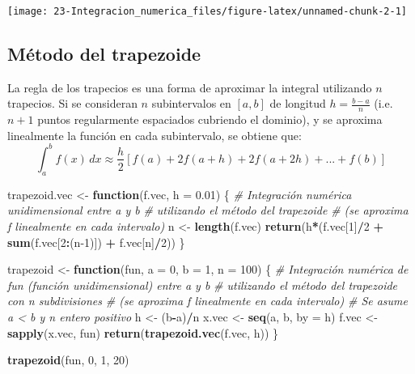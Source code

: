 \documentclass[
]{book}
\newenvironment{Shaded}{\begin{snugshade}}{\end{snugshade}}
\newcommand{\CommentTok}[1]{\textcolor[rgb]{0.56,0.35,0.01}{\textit{#1}}}
\newcommand{\ControlFlowTok}[1]{\textcolor[rgb]{0.13,0.29,0.53}{\textbf{#1}}}
\newcommand{\DataTypeTok}[1]{\textcolor[rgb]{0.13,0.29,0.53}{#1}}
\newcommand{\DecValTok}[1]{\textcolor[rgb]{0.00,0.00,0.81}{#1}}
\newcommand{\FloatTok}[1]{\textcolor[rgb]{0.00,0.00,0.81}{#1}}
\newcommand{\KeywordTok}[1]{\textcolor[rgb]{0.13,0.29,0.53}{\textbf{#1}}}
\newcommand{\NormalTok}[1]{#1}
\newcommand{\OperatorTok}[1]{\textcolor[rgb]{0.81,0.36,0.00}{\textbf{#1}}}
\newcommand{\StringTok}[1]{\textcolor[rgb]{0.31,0.60,0.02}{#1}}
\theoremstyle{break}
\theoremstyle{definition}
\theoremstyle{definition}
\theoremstyle{definition}
\theoremstyle{remark}
\begin{document}
\begin{center}\texttt{[image: 23-Integracion\_numerica\_files/figure-latex/unnamed-chunk-2-1]} \end{center}

\hypertarget{muxe9todo-del-trapezoide}{%
\subsection{Método del trapezoide}\label{muxe9todo-del-trapezoide}}

La regla de los trapecios es una forma de aproximar la integral utilizando \(n\) trapecios.
Si se consideran \(n\) subintervalos en \([a,b]\) de longitud \(h= \frac{b-a}{n}\)
(i.e.~\(n + 1\) puntos regularmente espaciados cubriendo el dominio), y
se aproxima linealmente la función en cada subintervalo, se obtiene que:
\[\int_a^b f(x)\, dx \approx \frac{h}{2} [f(a)+2f(a+h)+2f(a+2h)+...+f(b)]\]

\begin{Shaded}
\begin{Highlighting}[]
\NormalTok{trapezoid.vec <-}\StringTok{ }\ControlFlowTok{function}\NormalTok{(f.vec, }\DataTypeTok{h =} \FloatTok{0.01}\NormalTok{) \{}
\CommentTok{# Integración numérica unidimensional entre a y b}
\CommentTok{# utilizando el método del trapezoide }
\CommentTok{# (se aproxima f linealmente en cada intervalo)}
\NormalTok{  n <-}\StringTok{ }\KeywordTok{length}\NormalTok{(f.vec) }
  \KeywordTok{return}\NormalTok{(h}\OperatorTok{*}\NormalTok{(f.vec[}\DecValTok{1}\NormalTok{]}\OperatorTok{/}\DecValTok{2} \OperatorTok{+}\StringTok{ }\KeywordTok{sum}\NormalTok{(f.vec[}\DecValTok{2}\OperatorTok{:}\NormalTok{(n}\DecValTok{-1}\NormalTok{)]) }\OperatorTok{+}\StringTok{ }\NormalTok{f.vec[n]}\OperatorTok{/}\DecValTok{2}\NormalTok{))}
\NormalTok{\}}

\NormalTok{trapezoid <-}\StringTok{ }\ControlFlowTok{function}\NormalTok{(fun, }\DataTypeTok{a =} \DecValTok{0}\NormalTok{, }\DataTypeTok{b =} \DecValTok{1}\NormalTok{, }\DataTypeTok{n =} \DecValTok{100}\NormalTok{) \{}
\CommentTok{# Integración numérica de fun (función unidimensional) entre a y b}
\CommentTok{# utilizando el método del trapezoide con n subdivisiones}
\CommentTok{# (se aproxima f linealmente en cada intervalo)}
\CommentTok{# Se asume a < b y n entero positivo }
\NormalTok{  h <-}\StringTok{ }\NormalTok{(b}\OperatorTok{-}\NormalTok{a)}\OperatorTok{/}\NormalTok{n}
\NormalTok{  x.vec <-}\StringTok{ }\KeywordTok{seq}\NormalTok{(a, b, }\DataTypeTok{by =}\NormalTok{ h)}
\NormalTok{  f.vec <-}\StringTok{ }\KeywordTok{sapply}\NormalTok{(x.vec, fun)}
  \KeywordTok{return}\NormalTok{(}\KeywordTok{trapezoid.vec}\NormalTok{(f.vec, h))}
\NormalTok{\}}

\KeywordTok{trapezoid}\NormalTok{(fun, }\DecValTok{0}\NormalTok{, }\DecValTok{1}\NormalTok{, }\DecValTok{20}\NormalTok{)}
\end{Highlighting}
\end{Shaded}
\end{document}
